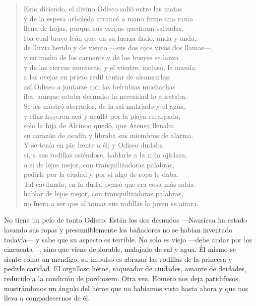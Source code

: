\begin{verse}
Esto diciendo, el divino Odiseo salió entre las matas\\
y de la espesa arboleda arrancó a mano firme una rama\\
llena de hojas, porque sus verijas quedaran salvadas.\\
Iba cual bravo león que, en su fuerza fiado, anda y anda,\\
de lluvia herido y de viento ---sus dos ojos vivos dos llamas---,\\
y en medio de los carneros y de los bueyes se lanza\\
y de las ciervas montesas, y el vientre, incluso, le manda\\
a las ovejas en prieto redil tentar de alcanzarlas;\\
así Odiseo a juntarse con las belrubias muchachas\\
iba, aunque estaba desnudo: la necesidad lo apretaba.\\
Se les mostró aterrador, de la sal malajado y el agua,\\
y ellas huyeron acá y acullá por la playa escarpada;\\
solo la hija de Alcínoo quedó, que Atenea llenaba\\
su corazón de osadía y libraba sus miembros de alarma.\\
Y se tenía en pie frente a él; y Odiseo dudaba\\
si, a sus rodillas asiéndose, hablarle a la niña ojiclara,\\
o si de lejos mejor, con tranquilizadoras palabras,\\
pedirle por la ciudad y por si algo de ropa le daba.\\
Tal cavilando, en la duda, pensó que era cosa más sabia\\
hablar de lejos mejor, con tranquilizadoras palabras,\\
no fuera a ser que al tomar sus rodillas la joven se airara.
\end{verse}

No tiene un pelo de tonto Odiseo. Están los dos desnudos ---Nausícaa ha estado lavando sus ropas y presumiblemente los bañadores no se habían inventado todavía--- y sabe que su aspecto es terrible. No solo es viejo ---debe andar por los cincuenta---, sino que viene deplorable, malajado de sal y agua. Él mismo se siente como un mendigo, su impulso es abrazar las rodillas de la princesa y pedirle caridad. El orgulloso héroe, saqueador de ciudades, amante de deidades, reducido a la condición de pordiosero. Otra vez, Homero nos deja patidifusos, mostrándonos un ángulo del héroe que no habíamos visto hasta ahora y que nos lleva a compadecernos de él.

